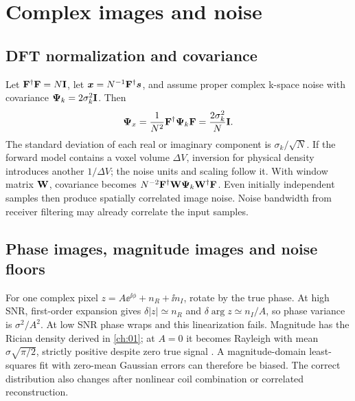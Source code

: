 \section{Complex images and noise}
\label{sec:06:complex-images-and-noise}
\subsection{DFT normalization and covariance}
Let \(\mathbf{F}^\dagger\mathbf{F}=N\mathbf{I}\), let
\(\bm{x}=N^{-1}\mathbf{F}^\dagger\bm{s}\), and assume proper complex k-space noise with covariance \(\mathbf{\Psi}_k=2\sigma_k^2\mathbf{I}\). Then
\begin{equation}
 \mathbf{\Psi}_x=\frac{1}{N^2}\mathbf{F}^\dagger\mathbf{\Psi}_k\mathbf{F}
           =\frac{2\sigma_k^2}{N}\mathbf{I}.
 \label{eq:06:noise}
\end{equation}
The standard deviation of each real or imaginary component is \(\sigma_k/\sqrt N\). If the forward model contains a voxel volume \(\Delta V\), inversion for physical density introduces another \(1/\Delta V\); the noise units and scaling follow it. With window matrix \(\mathbf{W}\), covariance becomes
\(N^{-2}\mathbf{F}^\dagger\mathbf{W}\mathbf{\Psi}_k\mathbf{W}^\dagger\mathbf{F}\).
Even initially independent samples then produce spatially correlated image noise. Noise bandwidth from receiver filtering may already correlate the input samples.

\subsection{Phase images, magnitude images and noise floors}
For one complex pixel \(z=A\ee^{\ii\phi}+n_R+\ii n_I\), rotate by the true phase. At high SNR, first-order expansion gives
\(\delta |z|\simeq n_R\) and \(\delta\arg z\simeq n_I/A\), so phase variance is \(\sigma^2/A^2\). At low SNR phase wraps and this linearization fails.
Magnitude has the Rician density derived in \cref{ch:01}; at \(A=0\) it becomes Rayleigh with mean \(\sigma\sqrt{\pi/2}\), strictly positive despite zero true signal \cite{gudbjartsson1995}. A magnitude-domain least-squares fit with zero-mean Gaussian errors can therefore be biased. The correct distribution also changes after nonlinear coil combination or correlated reconstruction.

